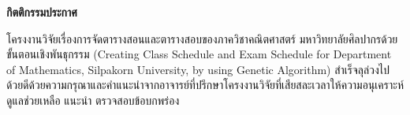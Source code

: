 \thispagestyle{empty}
\vspace{2 cm}
{\huge \bf กิตติกรรมประกาศ}
\vspace{2 cm}

โครงงานวิจัยเรื่องการจัดตารางสอนและตารางสอบของภาควิชาคณิตศาสตร์ \;\; มหาวิทยาลัยศิลปากรด้วยขั้นตอนเชิงพันธุกรรม (Creating Class Schedule and Exam Schedule for Department of Mathematics,	Silpakorn University, by using Genetic Algorithm)   สำเร็จลุล่วงไปด้วยดีด้วยความกรุณาและคำแนะนำจากอาจารย์ที่ปรึกษาโครงงานวิจัยที่เสียสละเวลาให้ความอนุเคราะห์ดูแลช่วยเหลือ แนะนำ ตรวจสอบข้อบกพร่อง 

\newpage